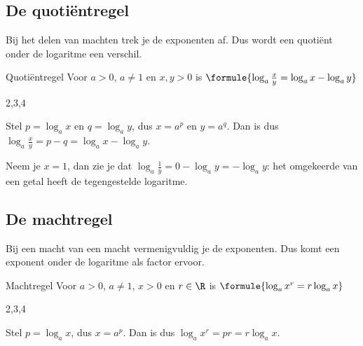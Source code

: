 \subsection{De quotiëntregel}

Bij het delen van machten trek je de exponenten af. Dus wordt een quotiënt onder de logaritme een verschil.

\begin{theorie}
\begin{stelling}{Quotiëntregel}
Voor $a > 0$, $a \neq 1$ en $x, y > 0$ is \qquad $\formule{\log_a \frac{x}{y} = \log_a x - \log_a y}$
\end{stelling}
\begin{alleenvoor}{2,3,4}
\begin{bewijs}
Stel $p = \log_a x$ en $q = \log_a y$, dus $x = a^p$ en $y = a^q$. Dan is
dus $\log_a \frac{x}{y} = p - q = \log_a x - \log_a y$.
\end{bewijs}
\end{alleenvoor}
\end{theorie}

Neem je $x = 1$, dan zie je dat $\log_a \frac1y = 0 - \log_a y = -\log_a y$: het omgekeerde van een getal heeft de tegengestelde logaritme.


\begin{oefeningen}
\end{oefeningen}

\subsection{De machtregel}

Bij een macht van een macht vermenigvuldig je de exponenten. Dus komt een exponent onder de logaritme als factor ervoor.

\begin{theorie}
\begin{stelling}{Machtregel}
Voor $a > 0$, $a \neq 1$, $x > 0$ en $r \in \R$ is \qquad $\formule{\log_a x^r = r \log_a x}$
\end{stelling}
\begin{alleenvoor}{2,3,4}
\begin{bewijs}
Stel $p = \log_a x$, dus $x = a^p$. Dan is
dus $\log_a x^r = pr = r \log_a x$.
\end{bewijs}
\end{alleenvoor}
\end{theorie}

